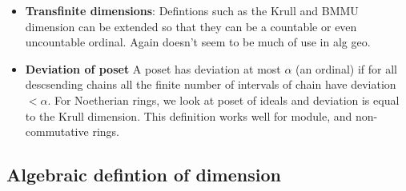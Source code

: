 \begin{definition}
\begin{itemize}
        \item \textbf{Transfinite dimensions}: Defintions such as the Krull and BMMU dimension can be extended so that they can be a countable or even uncountable ordinal. Again doesn't seem to be much of use in alg geo.
        \item \textbf{Deviation of poset} A poset has deviation at most $\alpha$ (an ordinal) if for all descsending chains all the finite number of intervals of chain have deviation $<\alpha$. For Noetherian rings, we look at poset of ideals and deviation is equal to the Krull dimension. This definition works well for module, and non-commutative rings.
    \end{itemize}
\end{definition}


\subsection{Algebraic defintion of dimension}

